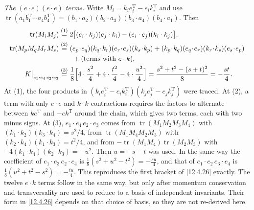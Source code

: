 \begin{tcolorbox}[breakable]
\begin{remark}
		\emph{The $(e\cdot e)(e\cdot e)$ terms.} Write $M_{i}=k_{i}e_{i}^{\mathrm{T}}-e_{i}k_{i}^{\mathrm{T}}$ and use $\operatorname{tr}(a_{1}b_{1}^{\mathrm{T}}\cdots a_{4}b_{4}^{\mathrm{T}})=(b_{1}\cdot a_{2})(b_{2}\cdot a_{3})(b_{3}\cdot a_{4})(b_{4}\cdot a_{1})$. Then
		\begin{align*}
			\operatorname{tr}(M_{i}M_{j})&\eqs{1} 2\bigl[(e_{i}\cdot k_{j})(e_{j}\cdot k_{i})-(e_{i}\cdot e_{j})(k_{i}\cdot k_{j})\bigr] ,\\
			\operatorname{tr}(M_{p}M_{q}M_{r}M_{s})&\eqs{2} (e_{p}\!\cdot\! e_{q})(k_{q}\!\cdot\! k_{r})(e_{r}\!\cdot\! e_{s})(k_{s}\!\cdot\! k_{p})+(k_{p}\!\cdot\! k_{q})(e_{q}\!\cdot\! e_{r})(k_{r}\!\cdot\! k_{s})(e_{s}\!\cdot\! e_{p})\\
			&\qquad+(\text{terms with }e\cdot k) ,\\
			K\big|_{e_{1}\cdot e_{4}\,e_{2}\cdot e_{3}}
			&\eqs{3} \frac18\Bigl[4\cdot\frac{s^{2}}{4}+4\cdot\frac{t^{2}}{4}-4\cdot\frac{u^{2}}{4}\Bigr]
			=\frac{s^{2}+t^{2}-(s+t)^{2}}{8}=-\frac{st}{4} .
		\end{align*}
		At (1), the four products in $(k_{i}e_{i}^{\mathrm{T}}-e_{i}k_{i}^{\mathrm{T}})(k_{j}e_{j}^{\mathrm{T}}-e_{j}k_{j}^{\mathrm{T}})$ were traced. At (2), a term with only $e\cdot e$ and $k\cdot k$ contractions requires the factors to alternate between $k e^{\mathrm{T}}$ and $-ek^{\mathrm{T}}$ around the chain, which gives two terms, each with two minus signs. At (3), $e_{1}\cdot e_{4}\,e_{2}\cdot e_{3}$ comes from $\operatorname{tr}(M_{1}M_{2}M_{3}M_{4})$ with $(k_{1}\cdot k_{2})(k_{3}\cdot k_{4})=s^{2}/4$, from $\operatorname{tr}(M_{1}M_{4}M_{2}M_{3})$ with $(k_{2}\cdot k_{4})(k_{1}\cdot k_{3})=t^{2}/4$, and from $-\operatorname{tr}(M_{1}M_{4})\operatorname{tr}(M_{2}M_{3})$ with $-4(k_{1}\cdot k_{4})(k_{2}\cdot k_{3})=-u^{2}$. Then $u=-s-t$ was used. In the same way the coefficient of $e_{1}\cdot e_{3}\,e_{2}\cdot e_{4}$ is $\frac18(s^{2}+u^{2}-t^{2})=-\frac{su}{4}$, and that of $e_{1}\cdot e_{2}\,e_{3}\cdot e_{4}$ is $\frac18(u^{2}+t^{2}-s^{2})=-\frac{tu}{4}$. This reproduces the first bracket of \eqref{12.4.26} exactly. The twelve $e\cdot k$ terms follow in the same way, but only after momentum conservation and transversality are used to reduce to a basis of independent invariants. Their form in \eqref{12.4.26} depends on that choice of basis, so they are not re-derived here.
	\end{remark}
\end{tcolorbox}

